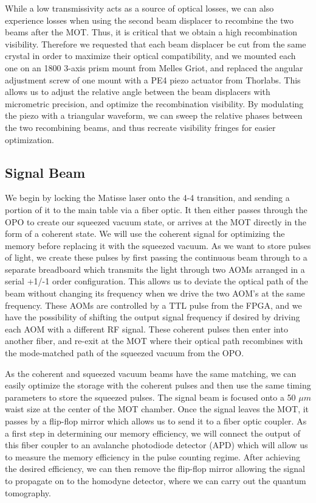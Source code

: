 While a low transmissivity acts as a source of optical losses, we can also experience losses when using the second beam displacer to recombine the two beams after the MOT.  Thus, it is critical that we obtain a high recombination visibility.  Therefore we requested that each beam displacer be cut from the same crystal in order to maximize their optical compatibility, and we mounted each one on an 1800 3-axis prism mount from Melles Griot, and replaced the angular adjustment screw of one mount with a PE4 piezo actuator from Thorlabs.  This allows us to adjust the relative angle between the beam displacers with micrometric precision, and optimize the recombination visibility.  By modulating the piezo with a triangular waveform, we can sweep the relative phases between the two recombining beams, and thus recreate visibility fringes for easier optimization.


\subsection{Signal Beam}


We begin by locking the Matisse laser onto the 4-4 transition, and sending a
portion of it to the main table via a fiber optic.  It then either passes
through the OPO to create our squeezed vacuum state, or arrives at the MOT
directly in the form of a coherent state.  We will use the coherent signal for
optimizing the memory before replacing it with the squeezed vacuum.   As we
want to store pulses of light, we create these pulses by first passing the continuous beam through to a
separate breadboard which transmits the light through two AOMs arranged in a serial +1/-1 order configuration.  This allows us to deviate the optical path of the beam without changing its frequency when we drive the two AOM's at the same frequency. These AOMs are controlled by a TTL pulse from the FPGA, and we have the possibility of shifting the output signal frequency if desired by driving each AOM with a different RF signal.  These coherent pulses then enter into another fiber, and re-exit at the MOT where their optical path recombines with the mode-matched path of the squeezed vacuum from the OPO.  

As the coherent and squeezed vacuum beams have the same matching, we can
easily optimize the storage with the coherent pulses and then use the same
timing parameters to store the squeezed pulses.  The signal beam is focused
onto a 50 $\mu m$ waist size at the center of the MOT chamber.  Once the
signal leaves the MOT, it passes by a flip-flop mirror which allows us to send
it to a fiber optic coupler.  As a first step in determining our memory
efficiency, we will connect the output of this fiber coupler to an avalanche
photodiode detector (APD) which will allow us to measure the memory efficiency
in the pulse counting regime.  After achieving the desired efficiency, we can
then remove the flip-flop mirror allowing the signal to propagate on to the homodyne detector, where we can carry out the quantum tomography.



